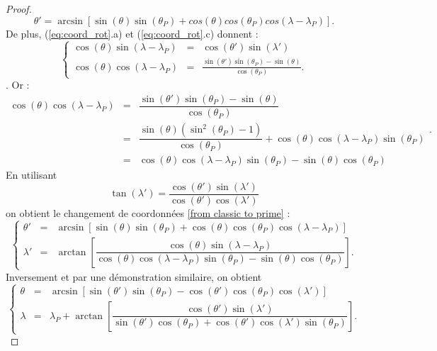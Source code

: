 \begin{proof}
\begin{equation}
\theta' = \arcsin \left[ \sin( \theta) \sin(\theta_P) + cos( \theta ) cos( \theta_P) cos( \lambda - \lambda_P ) \right] .
\end{equation}
De plus, (\ref{eq:coord_rot}.a) et (\ref{eq:coord_rot}.c) donnent :
\begin{equation}
\left\lbrace 
\begin{array}{rcl}
\cos( \theta ) \sin( \lambda - \lambda_P) & = & \cos( \theta' ) \sin( \lambda' ) \\
\cos( \theta ) \cos( \lambda - \lambda_P) & = & \frac{\sin( \theta' ) \sin ( \theta_P ) - \sin( \theta )}{\cos( \theta_P)}.
\end{array}
\right.
\end{equation}.
Or :
\begin{equation*}
\begin{array}{rcl}
\cos( \theta ) \cos( \lambda - \lambda_P) & = & \dfrac{\sin( \theta' ) \sin ( \theta_P ) - \sin( \theta )}{\cos( \theta_P)} \\
 & = & \dfrac{\sin( \theta) (\sin^2 ( \theta_P) -1 )}{\cos( \theta_P)} + \cos( \theta ) \cos( \lambda- \lambda_P) \sin( \theta_P)\\
 & = & \cos ( \theta) \cos( \lambda - \lambda_P) \sin( \theta_P ) - \sin( \theta) \cos ( \theta_P )
\end{array} .
\end{equation*}
En utilisant 
\begin{equation}
\tan ( \lambda' ) =  \dfrac{\cos( \theta' ) \sin(  \lambda' ) }{\cos( \theta' ) \cos(  \lambda' )}
\end{equation}
on obtient le changement de coordonnées \eqref{from classic to prime} :
\begin{equation}
\left\lbrace 
\begin{array}{rcl}
\theta' & = & \arcsin \left[ \sin( \theta) \sin(\theta_P) + \cos( \theta ) \cos( \theta_P) \cos( \lambda - \lambda_P ) \right] \\
\lambda' & = & \arctan \left[ \dfrac{\cos ( \theta) \sin( \lambda - \lambda_P)}{\cos( \theta) \cos( \lambda - \lambda_P) \sin( \theta_P) - \sin( \theta) \cos( \theta_P)} \right].
\end{array}
\right.
\end{equation}
Inversement et par une démonstration similaire, on obtient
\begin{equation}
\left\lbrace 
\begin{array}{rcl}
\theta & = & \arcsin \left[ \sin( \theta') \sin(\theta_P) - \cos( \theta' ) \cos( \theta_P) \cos( \lambda' ) \right] \\
\lambda & = & \lambda_P + \arctan \left[ \dfrac{\cos ( \theta') \sin( \lambda ')}{\sin( \theta') \cos( \theta_P) + \cos ( \theta') \cos( \lambda') \sin ( \theta_P)} \right].
\end{array}
\right.
\end{equation}
\end{proof}

